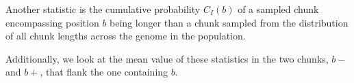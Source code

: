 \documentclass[12pt]{article}
\begin{document}
Another statistic is the cumulative probability $C_I(b)$ of a sampled chunk encompassing position $b$ being longer than a chunk sampled from the distribution of all chunk lengths across the genome in the population. 

Additionally, we look at the mean value of these statistics in the two chunks, $b-$ and $b+$, that flank the one containing $b$.






\end{document}
